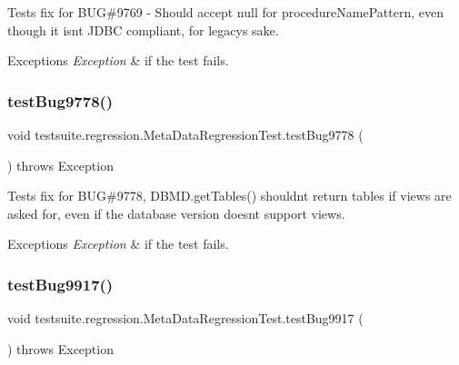 Tests fix for B\+UG\#9769 -\/ Should accept null for procedure\+Name\+Pattern, even though it isn\textquotesingle{}t J\+D\+BC compliant, for legacy\textquotesingle{}s sake.


\begin{DoxyExceptions}{Exceptions}
{\em Exception} & if the test fails. \\
\hline
\end{DoxyExceptions}
\mbox{\label{classtestsuite_1_1regression_1_1_meta_data_regression_test_a0cb82d7f4b575ebc9da191ff69ab222c}} 
\subsubsection{\texorpdfstring{test\+Bug9778()}{testBug9778()}}
{\footnotesize\ttfamily void testsuite.\+regression.\+Meta\+Data\+Regression\+Test.\+test\+Bug9778 (\begin{DoxyParamCaption}{ }\end{DoxyParamCaption}) throws Exception}

Tests fix for B\+UG\#9778, D\+B\+M\+D.\+get\+Tables() shouldn\textquotesingle{}t return tables if views are asked for, even if the database version doesn\textquotesingle{}t support views.


\begin{DoxyExceptions}{Exceptions}
{\em Exception} & if the test fails. \\
\hline
\end{DoxyExceptions}
\mbox{\label{classtestsuite_1_1regression_1_1_meta_data_regression_test_a091172fd69f6c74846e6d1d59d889924}} 
\subsubsection{\texorpdfstring{test\+Bug9917()}{testBug9917()}}
{\footnotesize\ttfamily void testsuite.\+regression.\+Meta\+Data\+Regression\+Test.\+test\+Bug9917 (\begin{DoxyParamCaption}{ }\end{DoxyParamCaption}) throws Exception}

